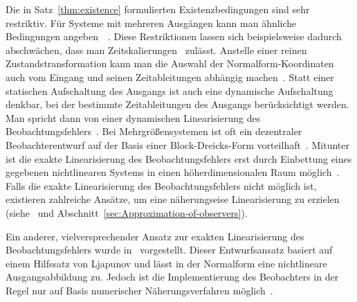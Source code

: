 \begin{remark}
Die in Satz~\ref{thm:existence} formulierten Existenzbedingungen
sind sehr restriktiv. Für Systeme mit mehreren Ausgängen kann man
ähnliche Bedingungen angeben~~\cite{krener85observer,xia88,xia89}.
Diese Restriktionen lassen sich beispielsweise dadurch abschwächen,
dass man Zeitskalierungen~\cite{guay2002,respondek2004,wang2010}
zulässt. Anstelle einer reinen Zustandstransformation kann man die
Auswahl der Normalform-Koordinaten auch vom Eingang und seinen Zeit\-ab\-leitungen
abhängig machen~\cite{zeitz87,zeitz87correspondence,proychev1993,glumineau1996,plestan1997,mishkov2005}.
Statt einer statischen Aufschaltung des Ausgangs ist auch eine dynamische
Aufschaltung denkbar, bei der bestimmte Zeitableitungen des Ausgangs
berücksichtigt werden. Man spricht dann von einer dynamischen Linearisierung
des Beobachtungsfehlers~\cite{noh2001,noh2004}. Bei Mehrgrößensystemen
ist oft ein dezentraler Beobachterentwurf auf der Basis einer Block-Dreicks-Form
vorteilhaft~\cite{rudolph1994,schaffner97,schaffner97ecc,schaffner98,schaffner99ijss,schaffner99,wang2006}.
Mitunter ist die exakte Linearisierung des Beobachtungsfehlers erst
durch Einbettung eines gegebenen nichtlinearen Systems in einen höherdimensionalen
Raum möglich~\cite{back2002,back2005}. Falls die exakte Linearisierung
des Beobachtungsfehlers nicht möglich ist, existieren zahlreiche Ansätze,
um eine näherungseise Linearisierung zu erzielen (siehe~\cite{karahan89,nicosia89,krener91poincare,bortoff95,banaszuk97,moreno2005syncod}
und Abschnitt~\ref{sec:Approximation-of-observers}).
\end{remark}

\begin{remark}
\label{rem:Boebachter-mit-Hilfssatz-von-Ljapunov}Ein anderer, vielversprechender
Ansatz zur exakten Linearisierung des Beobachtungsfehlers wurde in~\cite{kazantzis1998,krener2002,xiao2006}
vorgestellt. Dieser Entwurfsansatz basiert auf einem Hilfssatz von
Ljapunov und lässt in der Normalform eine nicht\-lineare Ausgangsabbildung
zu. Jedoch ist die Implementierung des Beobachters in der Regel nur
auf Basis numerischer Näherungsverfahren möglich~\cite{deutscher2006,deutscher2007}.
\end{remark}

